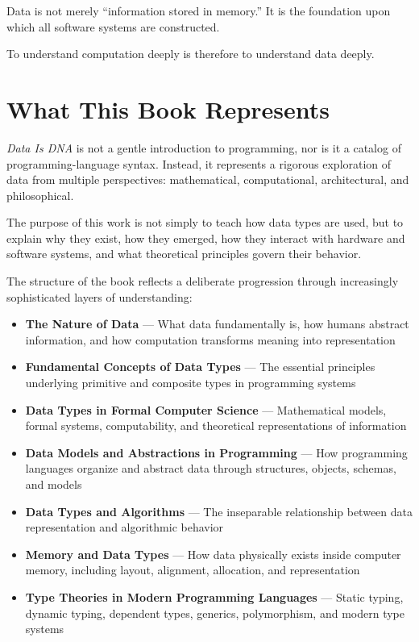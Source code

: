 Data is not merely “information stored in memory.” It is the foundation upon which all software systems are constructed.

To understand computation deeply is therefore to understand data deeply.

\section*{What This Book Represents}

\textit{Data Is DNA} is not a gentle introduction to programming, nor is it a catalog of programming-language syntax. Instead, it represents a rigorous exploration of data from multiple perspectives: mathematical, computational, architectural, and philosophical.

The purpose of this work is not simply to teach how data types are used, but to explain why they exist, how they emerged, how they interact with hardware and software systems, and what theoretical principles govern their behavior.

The structure of the book reflects a deliberate progression through increasingly sophisticated layers of understanding:

\begin{itemize}
	\item \textbf{The Nature of Data} — What data fundamentally is, how humans abstract information, and how computation transforms meaning into representation
	
	\item \textbf{Fundamental Concepts of Data Types} — The essential principles underlying primitive and composite types in programming systems
	
	\item \textbf{Data Types in Formal Computer Science} — Mathematical models, formal systems, computability, and theoretical representations of information
	
	\item \textbf{Data Models and Abstractions in Programming} — How programming languages organize and abstract data through structures, objects, schemas, and models
	
	\item \textbf{Data Types and Algorithms} — The inseparable relationship between data representation and algorithmic behavior
	
	\item \textbf{Memory and Data Types} — How data physically exists inside computer memory, including layout, alignment, allocation, and representation
	
	\item \textbf{Type Theories in Modern Programming Languages} — Static typing, dynamic typing, dependent types, generics, polymorphism, and modern type systems
\end{itemize}

